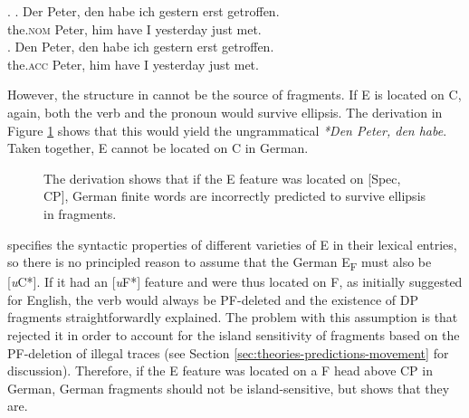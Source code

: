 \ex. \ag. Der Peter, den habe ich gestern erst getroffen.\\
	  the.\textsc{nom} Peter, him have I yesterday just met.\\
     \bg. Den Peter, den habe ich gestern erst getroffen.\\
     	  the.\textsc{acc} Peter, him have I yesterday just met.\\

However, the structure in \Last[b] cannot be the source of fragments. If E is located on C, again, both the verb and the pronoun would survive ellipsis. The derivation in Figure \ref{fig:merchant-spec-cp} shows that this would yield the ungrammatical \textit{*Den Peter, den habe}. Taken together, E cannot be located on C in German.
%
\begin{figure}[t]

\caption{The derivation shows that if the E feature was located on [Spec, CP], German finite words are incorrectly predicted to survive ellipsis in fragments.\label{fig:merchant-spec-cp}}
\end{figure}
%
\citet{merchant2004} specifies the syntactic properties of different varieties of E in their lexical entries, so there is no principled reason to assume that the German E\textsubscript{F} must also be [\textit{u}C*]. If it had an [\textit{u}F*] feature and were thus located on F, as \citet{merchant2004} initially suggested for English, the verb would always be PF-deleted and the existence of DP fragments straightforwardly explained. The problem with this assumption is that \citet{merchant2004} rejected it in order to account for the island sensitivity of fragments based on the PF-deletion of illegal traces (see Section \ref{sec:theories-predictions-movement} for discussion). Therefore, if the E feature was located on a F head above CP in German, German fragments should not be island-sensitive, but \Next shows that they are.%
